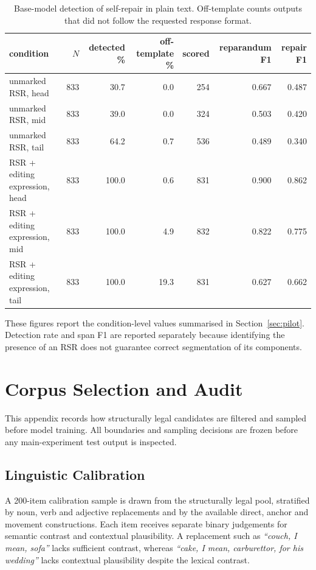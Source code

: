 \documentclass{article}
\begin{document}
\begin{table}[ht]
\centering
\small
\begin{tabular}{lrrrrrr}
\toprule
condition & $N$ & detected \% & off-template \% & scored & reparandum F1 & repair F1 \\
\midrule
unmarked RSR, head          & 833 & 30.7 &  0.0 & 254 & 0.667 & 0.487 \\
unmarked RSR, mid           & 833 & 39.0 &  0.0 & 324 & 0.503 & 0.420 \\
unmarked RSR, tail          & 833 & 64.2 &  0.7 & 536 & 0.489 & 0.340 \\
\addlinespace
RSR + editing expression, head & 833 & 100.0 &  0.6 & 831 & 0.900 & 0.862 \\
RSR + editing expression, mid  & 833 & 100.0 &  4.9 & 832 & 0.822 & 0.775 \\
RSR + editing expression, tail & 833 & 100.0 & 19.3 & 831 & 0.627 & 0.662 \\
\bottomrule
\end{tabular}
\caption{Base-model detection of self-repair in plain text. Off-template counts
outputs that did not follow the requested response format.}
\label{tab:ablation}
\end{table}

These figures report the condition-level values summarised in
Section~\ref{sec:pilot}. Detection rate and span F1 are reported separately
because identifying the presence of an RSR does not guarantee correct
segmentation of its components.

\section{Corpus Selection and Audit}
\label{app:corpus-selection}

This appendix records how structurally legal candidates are filtered and
sampled before model training. All boundaries and sampling decisions are
frozen before any main-experiment test output is inspected.

\subsection{Linguistic Calibration}

A 200-item calibration sample is drawn from the structurally legal pool,
stratified by noun, verb and adjective replacements and by the available
direct, anchor and movement constructions. Each item receives separate binary
judgements for semantic contrast and contextual plausibility. A replacement
such as \textit{``couch, I mean, sofa''} lacks sufficient contrast, whereas
\textit{``cake, I mean, carburettor, for his wedding''} lacks contextual
plausibility despite the lexical contrast.
\end{document}
